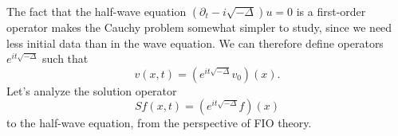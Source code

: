 \documentclass{article}
\theoremstyle{plain}
\theoremstyle{remark}
\theoremstyle{definition}
\begin{document}
The fact that the half-wave equation $(\partial_t - i \sqrt{-\Delta}) u = 0$ is a first-order operator makes the Cauchy problem somewhat simpler to study, since we need less initial data than in the wave equation. We can therefore define operators $e^{it \sqrt{-\Delta}}$ such that
%
\[ v(x,t) = (e^{i t \sqrt{-\Delta}} v_0)(x). \]
%
Let's analyze the solution operator
%
\[ Sf(x,t) = (e^{i t \sqrt{-\Delta}} f)(x) \]
%
to the half-wave equation, from the perspective of FIO theory.

\begin{comment}

Fourier transform of e^{-|x|} is

	c_d (1 + |xi|^2)^{- (d+1) / 2}

Fourier transform of e^{- lambda |x|} for lambda > 0 is

	int e^{- lambda |x|} e^{-i xi * x} dx
	= c_d lambda^{-d} (1 + |xi|^2 / lambda^2)^{-(d+1)/2}

Can we now apply analytic continuation to conclude that
the Fourier transform of e^{-it |x|} is equal to

	c_d (it)^{-d} ( 1 + |xi|^2 / (it + 0)^2 )^{-(d+1)/2}

where we take the branch of the square root that is the analytic extension
away of the normal square root away, defined away from the imaginary axis.

Then for |xi| > t this quantity is equal to

	c_d i t^{-d} ( |xi|^2 / t^2 - 1 )^{-(d+1)/2}

e^{-i pi / 2}

sqrt( a e^{it} ) = sqrt(a) sqrt(e^{it/2})

\end{comment}

\begin{comment}

Let's start with the operators $\{ e^{it \sqrt{-\Delta}} \}$. We can write
%
\begin{align*}
	e^{i t \sqrt{-\Delta}} f(x) &= \int e^{2 \pi i (t |\xi| + \xi \cdot x)} \widehat{f}(\xi)\; d\xi\\
	&= \int e^{2 \pi i (t |\xi| + \xi \cdot (x - y))} f(y)\; dy\; d\xi\\
	&= \int a(x,y,\xi) e^{2 \pi i \phi_t(x,y,\xi)} f(y)\; dy\; d\xi,
\end{align*}
%
where $a(x,y,\xi) = 1$, and $\phi_t(x,y,\xi) = t |\xi| + \xi \cdot (x - y)$. The function $a$ is a symbol of order zero, and the function $\phi_t$ is a non-degenerate phase function with canonical relation defined by the equations
%
\[ \left\{ x = y + t \frac{\xi}{|\xi|}\ \text{and}\ \xi = \eta \right\}, \]
%
which, for a fixed $y$, we can think of as consisting of the sphere of radius $t$ at $y$, and all \emph{outward} pointing cotangent vectors on this sphere. Thus the operators $e^{it \sqrt{-\Delta}}$ are Fourier integrals of order $0$.

\end{comment}
\end{document}
